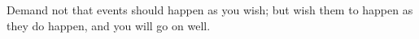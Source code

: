 Demand not that events should happen as you wish; but wish them to happen
as they do happen, and you will go on well.
